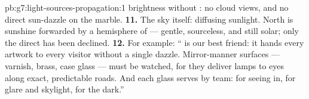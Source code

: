 \begin{solution}{pb:g7:light-sources-propagation:1}
brightness without : no cloud views, and no direct
sun-dazzle on the marble.
\textbf{11.} The sky itself:  diffusing sunlight. North 
is sunshine forwarded by a hemisphere of  --- gentle,
sourceless, and still solar; only the direct  has been
declined.
\textbf{12.} For example: `` is our best friend: it
hands every artwork to every visitor without a single dazzle.
Mirror-manner surfaces --- varnish, brass, case glass --- must
be watched, for they deliver lamps to eyes along exact,
predictable roads. And each glass serves by team: 
for seeing in,  for glare and skylight,  for
the dark.''
\end{solution}
